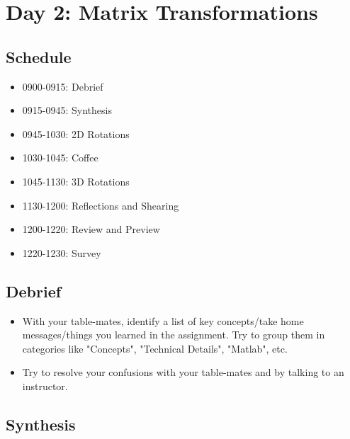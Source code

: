 \chapter{Day 2: Matrix Transformations}

\section{Schedule}
\begin{itemize}
\item 0900-0915: Debrief
\item 0915-0945: Synthesis
\item 0945-1030: 2D Rotations
\item 1030-1045: Coffee
\item 1045-1130: 3D Rotations
\item 1130-1200: Reflections and Shearing
\item 1200-1220: Review and Preview
\item 1220-1230: Survey
\end{itemize}

\section{Debrief}

\begin{itemize}

\item With your table-mates, identify a list of key concepts/take home messages/things you learned in the assignment. Try to group them in categories like "Concepts", "Technical Details", "Matlab", etc.

\item Try to resolve your confusions with your table-mates and by talking to an instructor.

\end{itemize}

\section{Synthesis}

